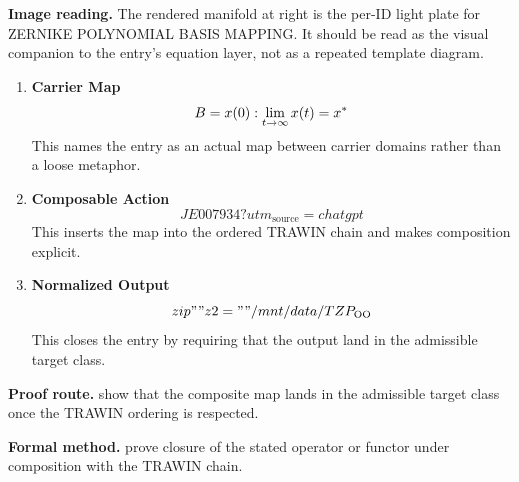 \begin{samepage}
\noindent\begin{minipage}[t]{0.45\linewidth}
\vspace{0pt}
\raggedright
\scriptsize\textbf{Image reading.} The rendered manifold at right is the per-ID light plate for ZERNIKE POLYNOMIAL BASIS MAPPING. It should be read as the visual companion to the entry's equation layer, not as a repeated template diagram.\par
\end{minipage}\hfill
\begin{minipage}[t]{0.53\linewidth}
\vspace*{-0.10in}
\raggedright
{}
\end{minipage}
\end{samepage}

\clearpage


\begin{enumerate}[leftmargin=1.6em,itemsep=9pt,topsep=6pt]
\item \textbf{Carrier Map}
\[
B = \\{ x(0) : \lim_{t\to\infty} x(t) = x^* \\}
\]
This names the entry as an actual map between carrier domains rather than a loose metaphor.

\item \textbf{Composable Action}
\[
JE007934?utm_{\mathrm{source}}=chatgpt
\]
This inserts the map into the ordered TRAWIN chain and makes composition explicit.

\item \textbf{Normalized Output}
\[
zip"" z2=""/mnt/data/TZP_{\mathrm{OO}}
\]
This closes the entry by requiring that the output land in the admissible target class.
\end{enumerate}

\textbf{Proof route.} show that the composite map lands in the admissible target class once the TRAWIN ordering is respected.

\textbf{Formal method.} prove closure of the stated operator or functor under composition with the TRAWIN chain.

\medskip
{}

